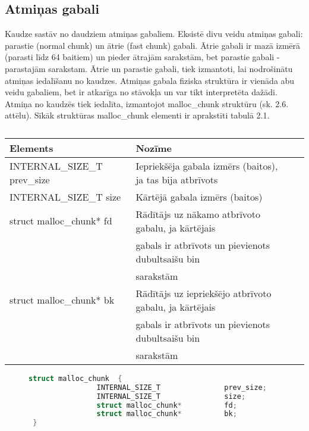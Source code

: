 \subsection{Atmiņas gabali}
\label{subsec:atminas_gabali}

Kaudze sastāv no daudziem atmiņas gabaliem.
Eksistē divu veidu atmiņas gabali: parastie (normal chunk) un ātrie (fast chunk) gabali. 
Ātrie gabali ir mazā izmērā (parasti līdz 64 baitiem) un pieder ātrajām sarakstām, bet parastie gabali - parastajām sarakstam. 
Ātrie un parastie gabali, tiek izmantoti, lai nodrošinātu atmiņas iedalīšanu no kaudzes.
Atmiņas gabala fiziska struktūra ir vienāda abu veidu gabaliem, bet ir atkarīga no stāvokļa un var tikt interpretēta dažādi.
Atmiņa no kaudzēs tiek iedalīta, izmantojot malloc\_chunk struktūru (sk. 2.6. attēlu). 
Sīkāk struktūras malloc\_chunk elementi ir aprakstīti tabulā 2.1.

\begin{table}[H]
\caption{\textbf{\fontsize{11}{12}\selectfont {\\ Atmiņās gabalu struktūras elementu apraksts}}} 
\label{table:kysymys}
\centering
	\begin{tabular}{|l|l|r|p{5cm}|}
	  \hline
	Elements & Nozīme \\
	\hline
	  INTERNAL\_SIZE\_T               prev\_size & Iepriekšēja gabala izmērs (baitos), ja tas bija atbrīvots\\
      \hline
      INTERNAL\_SIZE\_T               size & Kārtējā gabala izmērs (baitos) \\
      \hline
      struct malloc\_chunk*          fd & Rādītājs uz nākamo atbrīvoto gabalu, ja kārtējais  \\
                                                     & gabals ir atbrīvots un pievienots dubultsaišu bin \\
                                                     & sarakstām\\
      \hline
      struct malloc\_chunk*          bk & Rādītājs uz iepriekšējo atbrīvoto gabalu, ja kārtējais  \\
                                                     & gabals ir atbrīvots un pievienots dubultsaišu bin \\
                                                     & sarakstām\\
    \hline
	\end{tabular}
\end{table}
\begin{figure}[h]
\begin{lstlisting}[language=C++]
struct malloc_chunk  {
                INTERNAL_SIZE_T               prev_size;
                INTERNAL_SIZE_T               size;
                struct malloc_chunk*          fd;
                struct malloc_chunk*          bk;
 }
\end{lstlisting}
\caption{\textbf{\fontsize{11}{12}\selectfont {Atmiņas gabala struktūra}}}
\end{figure}

